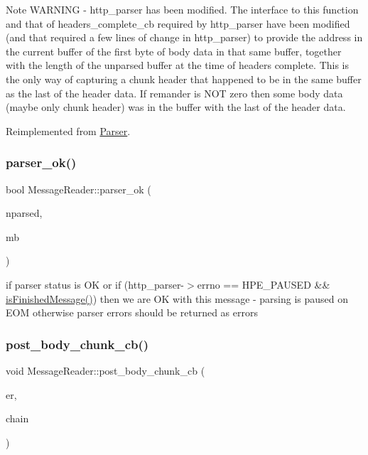 \begin{DoxyNote}{Note}
W\+A\+R\+N\+I\+NG -\/ http\+\_\+parser has been modified. The interface to this function and that of headers\+\_\+complete\+\_\+cb required by http\+\_\+parser have been modified (and that required a few lines of change in http\+\_\+parser) to provide the address in the current buffer of the first byte of body data in that same buffer, together with the length of the unparsed buffer at the time of headers complete. This is the only way of capturing a chunk header that happened to be in the same buffer as the last of the header data. If remander is N\+OT zero then some body data (maybe only chunk header) was in the buffer with the last of the header data. 
\end{DoxyNote}


Reimplemented from \hyperlink{class_parser}{Parser}.

\mbox{\label{class_message_reader_a378b9c5f8136ac24865b5fac3c22694c}} 
\subsubsection{\texorpdfstring{parser\+\_\+ok()}{parser\_ok()}}
{\footnotesize\ttfamily bool Message\+Reader\+::parser\+\_\+ok (\begin{DoxyParamCaption}\item[{int}]{nparsed,  }\item[{\hyperlink{struct_m_buffer}{M\+Buffer} \&}]{mb }\end{DoxyParamCaption})\hspace{0.3cm}{\ttfamily [protected]}}

if parser status is OK or if (http\+\_\+parser-\/$>$errno == H\+P\+E\+\_\+\+P\+A\+U\+S\+ED \&\& \hyperlink{class_parser_ad9d6c98af922409a78ff65083b1983e3}{is\+Finished\+Message()}) then we are OK with this message -\/ parsing is paused on E\+OM otherwise parser errors should be returned as errors\mbox{\label{class_message_reader_a82f75653a713d3b947ff3dee82a34d1f}} 
\subsubsection{\texorpdfstring{post\+\_\+body\+\_\+chunk\+\_\+cb()}{post\_body\_chunk\_cb()}}
{\footnotesize\ttfamily void Message\+Reader\+::post\+\_\+body\+\_\+chunk\+\_\+cb (\begin{DoxyParamCaption}\item[{Marvin\+::\+Error\+Type}]{er,  }\item[{\hyperlink{class_buffer_chain}{Buffer\+Chain}}]{chain }\end{DoxyParamCaption})\hspace{0.3cm}{\ttfamily [protected]}}

